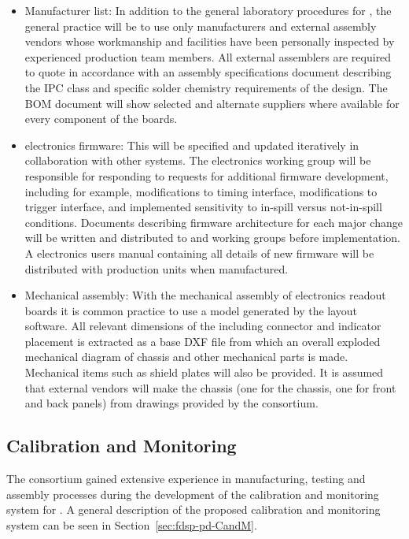 \begin{itemize}
\item Manufacturer list: In addition to the general laboratory procedures for , the general practice will be to use only  manufacturers and external assembly vendors whose workmanship and facilities have been personally inspected by experienced production team members. All external assemblers are required to quote in accordance with an assembly specifications document describing the IPC class and specific solder chemistry requirements of the design. The BOM document will show selected and alternate suppliers where available for every component of the  boards.

\item {} electronics firmware: This will be specified and updated iteratively in collaboration with other systems. The electronics working group will be responsible for responding to requests for additional firmware development, including for example, modifications to timing interface, modifications to trigger interface, and implemented sensitivity to in-spill versus not-in-spill conditions. Documents describing firmware architecture for each major change will be written and distributed to  and  working groups before implementation. A   electronics users manual containing all details of new firmware will be distributed with production units when manufactured.

\item Mechanical assembly: With the mechanical assembly of electronics readout boards it is common practice to use a \threed model generated by the layout software.   
All relevant dimensions of the  including connector and indicator placement is extracted as a base DXF file from which an overall exploded mechanical diagram of chassis and other mechanical parts is made.  Mechanical items such as shield plates will also be provided. It is assumed that external vendors will make the  chassis %
(one for the chassis, one for front and back panels) from drawings provided by the consortium.

\end{itemize}

\subsection{Calibration and Monitoring}
\label{sec:fdsp-pd-assy-CandM}

The consortium gained extensive experience in manufacturing, testing and assembly processes 
during the development of the calibration and monitoring system for .
A general description of the proposed calibration and monitoring system can be seen in  Section~\ref{sec:fdsp-pd-CandM}. 

